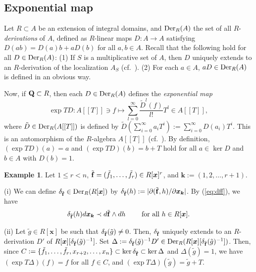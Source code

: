 \documentclass{amsart}
\theoremstyle{plain}
\theoremstyle{definition}
\newtheorem{example}[thm]{Example}
\newcommand{\Der }{\mathop{\rm Der}\nolimits}
\newcommand{\nd}{\noindent}
\newcommand{\Q}{{\bf Q}}
\newcommand{\x}{{\boldsymbol x}}
\newcommand{\bk}{{\boldsymbol k}}
\newcommand{\ff}{{\bf f}}
\newcommand{\Rx}{R[\x]}
\begin{document}
\subsection{Exponential map}\label{sect:EXP}



Let $R\subset A$ be an extension of integral domains, 
and $\Der _R(A)$ the set of all $R$-{\it derivations} of $A$, 
defined as 
$R$-linear maps $D:A\to A$ satisfying 
$D(ab)=D(a)b+aD(b)$ for all $a,b\in A$. 
Recall that the following hold for all $D\in \Der _R(A)$: 
(1) 
If $S$ is a multiplicative set of $A$, 
then $D$ uniquely extends to an $R$-derivation 
of the localization $A_S$ (cf.\ \cite[Exercise~25.3]{Matsumura}). 
(2) For each $a\in A$, 
$aD\in \Der _R(A)$ 
is defined in an obvious way. 



Now, if $\Q \subset R$, 
then each $D\in \Der _R(A)$ defines the {\it exponential map} 
$$
\exp TD:A[[T]]\ni f\mapsto 
\sum _{l=0}^{\infty }\dfrac{\tilde{D}^l(f)}{l!}T^l
\in A[[T]], 
$$
where 
$\tilde{D}\in \Der _R(A[[T]])$ is defined by 
$\tilde{D}(\sum _{i=0}^\infty a_iT^i)
:=\sum _{i=0}^\infty D(a_i)T^i$. 
This is an automorphism of the $R$-algebra $A[[T]]$ 
(cf.~\cite[Proposition 1.2.14]{Essen}). 
By definition, 
$(\exp TD)(a)=a$ and $(\exp TD)(b)=b+T$ 
hold for all $a\in \ker D$ and $b\in A$ with $D(b)=1$. 


\begin{example}\label{ex:JD}
Let $1\le r<n$, 
$\tilde{\ff }=(\tilde{f}_1,\ldots,\tilde{f}_r)\in \Rx ^r$, 
and $\bk :=(1,2,\ldots ,r+1)$. 


\nd (i) 
We can 
define $\delta _{\tilde{\ff }}\in \Der _R(\Rx )$ by 
$\delta _{\tilde{\ff }}(h):=|\partial (\tilde{\ff },h)/\partial \x _{\bk }|$. 
By (\ref{eq:dff}), we have 
\begin{equation}\label{eq:def:D_ff}
\delta _{\tilde{\ff }}(h)d\x _{\bk }\prec d\tilde{\ff }\wedge dh
\qquad \text{ for all }h\in \Rx . 
\end{equation}


\nd (ii) 
Let $\tilde{g}\in \Rx $ be such that 
$\delta _{\tilde{\ff }}(\tilde{g})\ne 0$. 
Then, 
$\delta _{\tilde{\ff }}$ uniquely extends to an $R$-derivation $D'$ of 
$\Rx [\delta _{\tilde{\ff }}(\tilde{g})^{-1}]$. 
Set $\Delta :=\delta _{\tilde{\ff }}(\tilde{g})^{-1}D'\in 
\Der _R(\Rx [\delta _{\tilde{\ff }}(\tilde{g})^{-1}])$. 
Then, since 
$C:=\{ \tilde{f}_1,\ldots ,\tilde{f}_r,x_{r+2},\ldots ,x_n\} 
\subset 
\ker \delta _{\tilde{\ff }}\subset \ker \Delta $ 
and $\Delta (\tilde{g})=1$, 
we have $(\exp T\Delta )(f)=f$ 
for all $f\in C$, 
and $(\exp T\Delta )(\tilde{g})=\tilde{g}+T$. 
\end{example}
\end{document}
